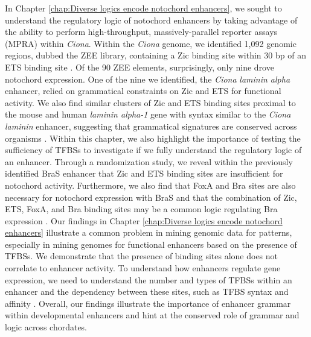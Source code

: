 \begin{dissertationepilogue}
    In Chapter \ref{chap:Diverse logics encode notochord enhancers}, we sought to understand the regulatory logic of notochord enhancers by taking advantage of the ability to perform high-throughput, massively-parallel reporter assays (MPRA) within \textit{Ciona}. Within the \textit{Ciona} genome, we identified 1,092 genomic regions, dubbed the ZEE library, containing a Zic binding site within 30 bp of an ETS binding site \cite{song2022}. Of the 90 ZEE elements, surprisingly, only nine drove notochord expression. One of the nine we identified, the \textit{Ciona} \textit{laminin alpha} enhancer, relied on grammatical constraints on Zic and ETS for functional activity. We also find similar clusters of Zic and ETS binding sites proximal to the mouse and human \textit{laminin alpha-1} gene with syntax similar to the \textit{Ciona laminin} enhancer, suggesting that grammatical signatures are conserved across organisms \cite{song2022}. Within this chapter, we also highlight the importance of testing the sufficiency of TFBSs to investigate if we fully understand the regulatory logic of an enhancer. Through a randomization study, we reveal within the previously identified BraS enhancer that Zic and ETS binding sites are insufficient for notochord activity. Furthermore, we also find that FoxA and Bra sites are also necessary for notochord expression with BraS and that the combination of Zic, ETS, FoxA, and Bra binding sites may be a common logic regulating Bra expression \cite{song2022}. Our findings in Chapter \ref{chap:Diverse logics encode notochord enhancers} illustrate a common problem in mining genomic data for patterns, especially in mining genomes for functional enhancers based on the presence of TFBSs. We demonstrate that the presence of binding sites alone does not correlate to enhancer activity. To understand how enhancers regulate gene expression, we need to understand the number and types of TFBSs within an enhancer and the dependency between these sites, such as TFBS syntax and affinity \cite{jindal2021}. Overall, our findings illustrate the importance of enhancer grammar within developmental enhancers and hint at the conserved role of grammar and logic across chordates. 


\end{dissertationepilogue}
